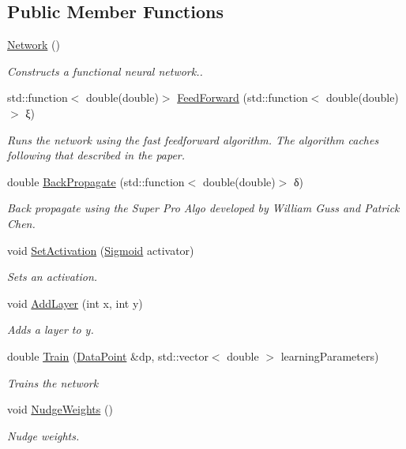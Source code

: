 \subsection*{Public Member Functions}
\begin{DoxyCompactItemize}
\item 
\hyperlink{classfnn_1_1_network_a5dd4695e1ce543dafc188d86cd691465}{Network} ()
\begin{DoxyCompactList}\small\item\em Constructs a functional neural network.. \end{DoxyCompactList}\item 
std\+::function$<$ double(double)$>$ \hyperlink{classfnn_1_1_network_a9e3f194d0b23fbdd92873b202798e1f9}{Feed\+Forward} (std\+::function$<$ double(double)$>$ ξ)
\begin{DoxyCompactList}\small\item\em Runs the network using the fast feedforward algorithm. The algorithm caches following that described in the paper. \end{DoxyCompactList}\item 
double \hyperlink{classfnn_1_1_network_a46144de037977a237b058db79bdb5cad}{Back\+Propagate} (std\+::function$<$ double(double)$>$ δ)
\begin{DoxyCompactList}\small\item\em Back propagate using the Super Pro Algo developed by William Guss and Patrick Chen. \end{DoxyCompactList}\item 
void \hyperlink{classfnn_1_1_network_a16e2878c6cc2dcb053c8c9ead48cd021}{Set\+Activation} (\hyperlink{classfnn_1_1_sigmoid}{Sigmoid} activator)
\begin{DoxyCompactList}\small\item\em Sets an activation. \end{DoxyCompactList}\item 
void \hyperlink{classfnn_1_1_network_a96ecfd11618f4abb26df9495bb904725}{Add\+Layer} (int x, int y)
\begin{DoxyCompactList}\small\item\em Adds a layer to \textquotesingle{}y\textquotesingle{}. \end{DoxyCompactList}\item 
double \hyperlink{classfnn_1_1_network_a38ed0637972cb29a3a0bc2b55a52979a}{Train} (\hyperlink{structfnn_1_1_data_point}{Data\+Point} \&dp, std\+::vector$<$ double $>$ learning\+Parameters)
\begin{DoxyCompactList}\small\item\em Trains the network \end{DoxyCompactList}\item 
void \hyperlink{classfnn_1_1_network_a8d794dcaf3949c7363950b61f572b78b}{Nudge\+Weights} ()
\begin{DoxyCompactList}\small\item\em Nudge weights. \end{DoxyCompactList}\end{DoxyCompactItemize}
